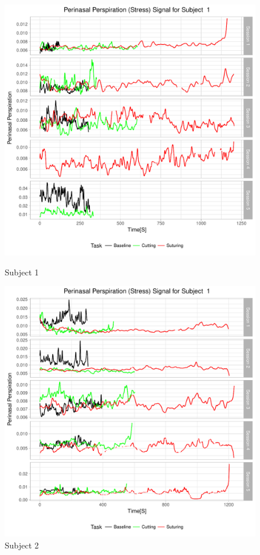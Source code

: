 \documentclass[12pt,epsf]{report}
\begin{document}
{\begin{figure}[!htb]
	\begin{minipage}[c]{0.5\linewidth}
	\includegraphics[width=\linewidth]{01_Perinasal_Perspiration.pdf}
	\caption{Subject 1 }
	\end{minipage}
	\hfill
	\begin{minipage}[c]{0.5\linewidth}
	\includegraphics[width=\linewidth]{02_Perinasal_Perspiration.pdf}
	\caption{Subject 2}
	\end{minipage}
\end{figure}
\FloatBarrier
}
\end{document}

